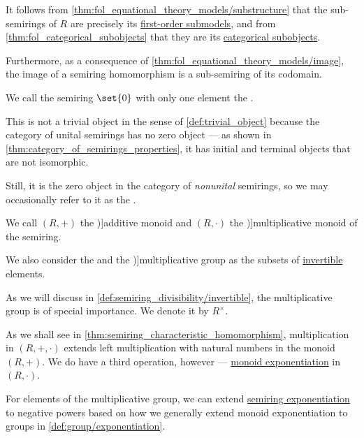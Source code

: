 \begin{definition}
\begin{thmenum}
    It follows from \cref{thm:fol_equational_theory_models/substructure} that the sub-semirings of \( R \) are precisely its \hyperref[def:fol_substructure/submodel]{first-order submodels}, and from \cref{thm:fol_categorical_subobjects} that they are its \hyperref[def:categorical_subobject]{categorical subobjects}.

    Furthermore, as a consequence of \cref{thm:fol_equational_theory_models/image}, the image of a semiring homomorphism is a sub-semiring of its codomain.

     We call the semiring \( \set{ 0 } \) with only one element the .

    This is not a trivial object in the sense of \cref{def:trivial_object} because the category of unital semirings has no zero object --- as shown in \cref{thm:category_of_semirings_properties}, it has initial and terminal objects that are not isomorphic.

    Still, it is the zero object in the category of \emph{nonunital} semirings, so we may occasionally refer to it as the .

    \mimprovised We call \( (R, +) \) the \term[ru=аддитивный моноид (\cite[176]{БелоусовТкачёв2004ДискретнаяМатематика})]{additive monoid} and \( (R, \cdot) \) the \term[ru=мультипликативный моноид (\cite[176]{БелоусовТкачёв2004ДискретнаяМатематика})]{multiplicative monoid} of the semiring.

    We also consider the  and the \term[en=multiplicative group (\cite[97]{Bourbaki1998Algebra1to3})]{multiplicative group} as the subsets of \hyperref[def:monoid_inverse]{invertible} elements.

    As we will discuss in \cref{def:semiring_divisibility/invertible}, the multiplicative group is of special importance. We denote it by \( R^\times \).

     As we shall see in \cref{thm:semiring_characteristic_homomorphism}, multiplication in \( (R, +, \cdot) \) extends left multiplication with natural numbers in the monoid \( (R, +) \). We do have a third operation, however --- \hyperref[def:monoid/exponentiation]{monoid exponentiation} in \( (R, \cdot) \).

    For elements of the multiplicative group, we can extend \hyperref[def:semiring/exponentiation]{semiring exponentiation} to negative powers based on how we generally extend monoid exponentiation to groups in \cref{def:group/exponentiation}.


\end{thmenum}
\end{definition}
